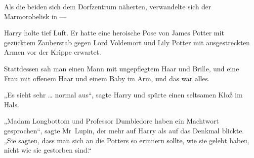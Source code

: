 Als die beiden sich dem Dorfzentrum näherten, verwandelte sich der Marmorobelisk in —

Harry holte tief Luft. Er hatte eine heroische Pose von James Potter mit gezücktem Zauberstab gegen Lord Voldemort und Lily Potter mit ausgestreckten Armen vor der Krippe erwartet.

Stattdessen sah man einen Mann mit ungepflegtem Haar und Brille, und eine Frau mit offenem Haar und einem Baby im Arm, und das war alles.

„Es sieht sehr … normal aus“, sagte Harry und spürte einen seltsamen Kloß im Hals.

„Madam Longbottom und Professor Dumbledore haben ein Machtwort gesprochen“, sagte Mr~Lupin, der mehr auf Harry als auf das Denkmal blickte.
„Sie sagten, dass man sich an die Potters so erinnern sollte, wie sie gelebt haben, nicht wie sie gestorben sind.“

